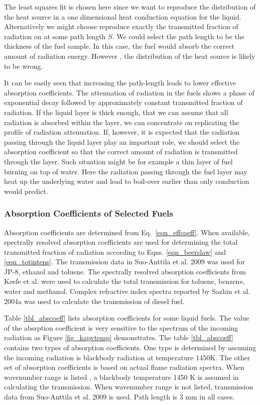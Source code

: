 The least squares fit is chosen here since we want to reproduce the distribution of the heat source in a one dimensional heat conduction equation for the liquid. Alternatively we might choose reproduce exactly the transmitted fraction of radiation on at some path length $S$. We could select the path length to be the thickness of the fuel sample. In this case, the fuel would absorb the correct amount of radiation energy. However , the distribution of the heat source is likely to be wrong.

It can be easily seen that increasing the path-length leads to lower effective absorption coefficients.  The attenuation of radiation in the fuels shows a phase of exponential decay followed by approximately constant transmitted fraction of radiation. If the liquid layer is thick enough, that we can assume that all radiation is absorbed within the layer, we can concentrate on replicating the profile of radiation attenuation. If, however, it is expected that the radiation passing through the liquid layer play an important role, we should select the absorption coefficient so that the correct amount of radiation is transmitted through the layer. Such situation might be for example a thin layer of fuel burning on top of water. Here the radiation passing through the fuel layer may heat up the underlying water and lead to boil-over earlier than only conduction would predict.

\subsubsection{Absorption Coefficients of Selected Fuels}

Absorption coefficients are determined from Eq.~\ref{eqn_effcoeff}. When available, spectrally resolved absorption coefficients are used for determining the total transmitted fraction of radiation according to Eqns. \ref{eqn_beerslaw} and \ref{eqn_totintens}.  The transmission data in Suo-Anttila et al. 2009 \cite{Suo-Anttila:PCT2009} was used for JP-8, ethanol and toluene. The spectrally resolved absorption coefficients from Keefe et al. were used to calculate the total transmission for toluene, benzene, water and methanol. Complex refractive index spectra reported by Sazhin et al. 2004a \cite{Sazhin:JHT2004a} was used to calculate the transmission of diesel fuel. 

Table \ref{tbl_abscoeff} lists absorption coefficients for some liquid fuels. The value of the absrption coefficient is very sensitive to the spectrum of the incoming radiation as Figure \ref{fig_kapvtemp} demonstrates. The table \ref{tbl_abscoeff} contains two types of absorption coefficients. One type is determined by assuming the incoming radiation is blackbody radiation at temperature 1450K. The other set of absorption coefficients is based on actual flame radiation spectra.  When wavenumber range is listed , a blackbody temperature 1450 K is assumed in calculating the transmission. When wavenumber range is not listed, transmission data from Suo-Anttila et al. 2009 \cite{Suo-Anttila:PCT2009} is used. Path length is 3 mm in all cases. 

